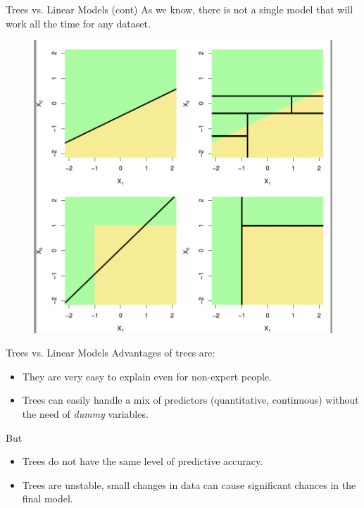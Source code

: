 \documentclass{beamer}
\begin{document}
\begin{frame}{Trees vs. Linear Models (cont)}
	As we know, there is not a single model that will work all the time for any dataset. 
	\begin{figure}[h]
	\centering
	\includegraphics[scale=0.4]{../../Figures/fig_trees_vs_ols.png}
\end{figure}	
\end{frame}

\begin{frame}{Trees vs. Linear Models}
	Advantages of trees are:
	\begin{itemize}
		\item They are very easy to explain even for non-expert people.
		\item Trees can easily handle a mix of predictors (quantitative, continuous) without the need of {\it dummy} variables.
	\end{itemize}
But 
\begin{itemize}
	\item Trees do not have the same level of predictive accuracy.
	\item Trees are unstable, small changes in data can cause significant chances in the final model.
\end{itemize}
\end{frame}
\end{document}
